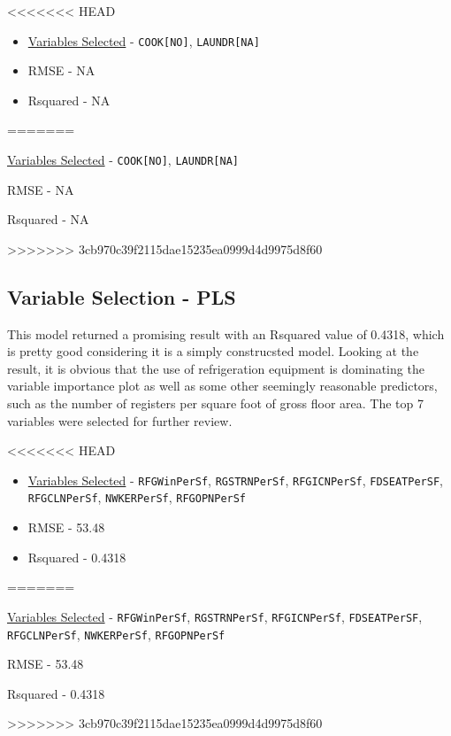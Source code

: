 <<<<<<< HEAD
\begin{itemize}
\item \hyperref[appendix:electricity:pca]{Variables Selected} - \lstinline{COOK[NO]}, \lstinline{LAUNDR[NA]}
\item RMSE - NA
\item Rsquared - NA
\end{itemize}
=======
\begin{myitemize}
\item \hyperref[appendix:electricity:pca]{Variables Selected} - \lstinline{COOK[NO]}, \lstinline{LAUNDR[NA]}
\item RMSE - NA
\item Rsquared - NA
\end{myitemize}
>>>>>>> 3cb970c39f2115dae15235ea0999d4d9975d8f60

\subsection{Variable Selection - PLS}

This model returned a promising result with an Rsquared value of 0.4318, which is pretty good considering it is a simply construcsted model.  Looking at the result, it is obvious that the use of refrigeration equipment is dominating the variable importance plot as well as some other seemingly reasonable predictors, such as the number of registers per square foot of gross floor area.  The top 7 variables were selected for further review.

<<<<<<< HEAD
\begin{itemize}
\item \hyperref[appendix:electricity:pls]{Variables Selected} - \lstinline{RFGWinPerSf}, \lstinline{RGSTRNPerSf}, \lstinline{RFGICNPerSf}, \lstinline{FDSEATPerSF}, \lstinline{RFGCLNPerSf}, \lstinline{NWKERPerSf}, \lstinline{RFGOPNPerSf}
\item RMSE - 53.48
\item Rsquared - 0.4318
\end{itemize}
=======
\begin{myitemize}
\item \hyperref[appendix:electricity:pls]{Variables Selected} - \lstinline{RFGWinPerSf}, \lstinline{RGSTRNPerSf}, \lstinline{RFGICNPerSf}, \lstinline{FDSEATPerSF}, \lstinline{RFGCLNPerSf}, \lstinline{NWKERPerSf}, \lstinline{RFGOPNPerSf}
\item RMSE - 53.48
\item Rsquared - 0.4318
\end{myitemize}
>>>>>>> 3cb970c39f2115dae15235ea0999d4d9975d8f60

